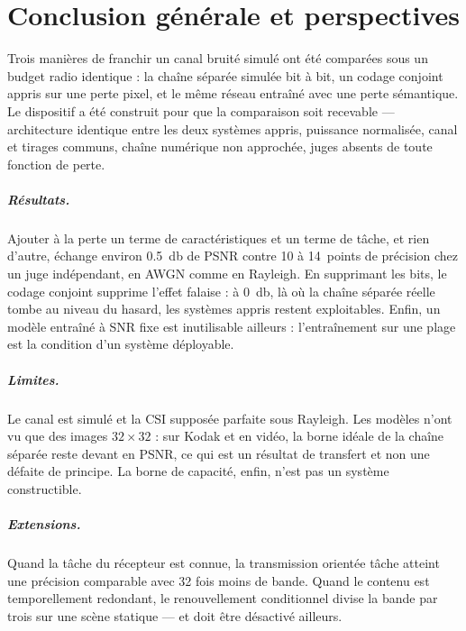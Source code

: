 \chapter*{Conclusion générale et perspectives}

Trois manières de franchir un canal bruité simulé ont été comparées sous un budget radio identique : la
chaîne séparée simulée bit à bit, un codage conjoint appris sur une perte pixel, et le même réseau entraîné
avec une perte sémantique. Le dispositif a été construit pour que la comparaison soit recevable —
architecture identique entre les deux systèmes appris, puissance normalisée, canal et tirages communs, chaîne
numérique non approchée, juges absents de toute fonction de perte.

\paragraph{Résultats.} Ajouter à la perte un terme de caractéristiques et un terme de tâche, et rien d'autre,
échange environ \SI{0.5}{\decibel} de PSNR contre 10 à 14~points de précision chez un juge indépendant, en
AWGN comme en Rayleigh. En supprimant les bits, le codage conjoint supprime l'effet falaise : à
\SI{0}{\decibel}, là où la chaîne séparée réelle tombe au niveau du hasard, les systèmes appris restent
exploitables. Enfin, un modèle entraîné à SNR fixe est inutilisable ailleurs : l'entraînement sur une plage
est la condition d'un système déployable.

\paragraph{Limites.} Le canal est simulé et la CSI supposée parfaite sous Rayleigh. Les modèles n'ont vu que
des images $32\times32$ : sur Kodak et en vidéo, la borne idéale de la chaîne séparée reste devant en PSNR,
ce qui est un résultat de transfert et non une défaite de principe. La borne de capacité, enfin, n'est pas un
système constructible.

\paragraph{Extensions.} Quand la tâche du récepteur est connue, la transmission orientée tâche atteint une
précision comparable avec 32 fois moins de bande. Quand le contenu est temporellement redondant, le
renouvellement conditionnel divise la bande par trois sur une scène statique — et doit être désactivé
ailleurs.

